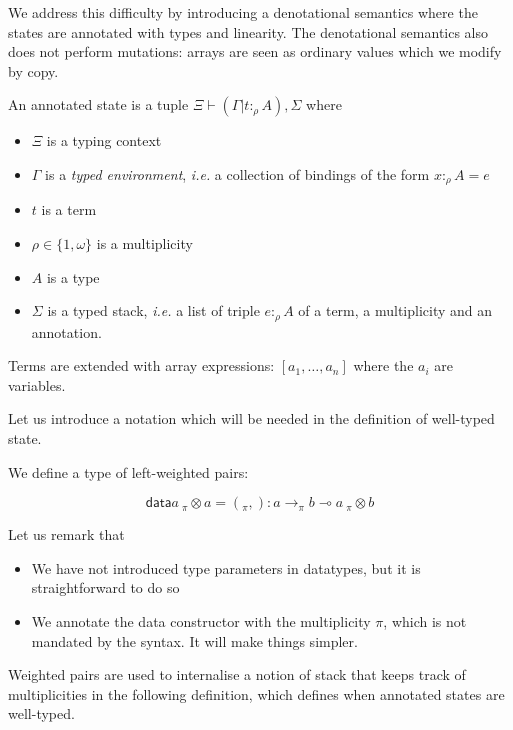 \documentclass[acmsmall,screen]{acmart}\settopmatter{}
\newcommand{\ie}{\textit{i.e.}\xspace}
\newcommand{\data}{\mathsf{data} }
\begin{document}
{We address this difficulty by introducing a denotational semantics where the states
are annotated with types and linearity. The denotational semantics
also does not perform mutations: arrays are seen as ordinary values
which we modify by copy.

\begin{definition}

  An annotated state is a tuple $Ξ ⊢ (Γ|t :_ρ A),Σ$ where
  \begin{itemize}
  \item $Ξ$ is a typing context
  \item $Γ$ is a \emph{typed environment}, \ie a collection of
    bindings of the form $x :_ρ A = e$
  \item $t$ is a term
  \item $ρ∈\{1,ω\}$ is a multiplicity
  \item $A$ is a type
  \item $Σ$ is a typed stack, \ie a list of triple $e:_ρ A$ of
    a term, a multiplicity and an annotation.
  \end{itemize}

  Terms are extended with array expressions: $[a_1, …, a_n]$ where the
  $a_i$ are variables.

\end{definition}

Let us introduce a notation which will be needed in the definition of
well-typed state.
\begin{definition}
  We define a type of left-weighted pairs:

  $$\data a~{}_π\!⊗ a = ({}_π\!,) : a →_π b ⊸ a~{}_π\!⊗ b$$

  Let us remark that
  \begin{itemize}
  \item We have not introduced type parameters in datatypes, but it
    is straightforward to do so
  \item We annotate the data constructor with the multiplicity $π$,
    which is not mandated by the syntax. It will make things simpler.
  \end{itemize}

\end{definition}

Weighted pairs are used to internalise a notion of stack that keeps
track of multiplicities in the following definition, which defines
when annotated states are well-typed.

}
\end{document}
